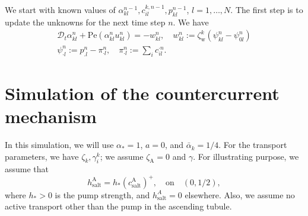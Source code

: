 \documentclass{article}
\begin{document}
We start with known values of $\alpha^{n-1}_{kl},c_{il}^{k,n-1}, p_{kl}^{n-1}$, $l = 1,\dots,N$.
The first step is to update the unknowns for the next time step $n$.
We have
\begin{gather}
    \mathcal{D}_t \alpha_{kl}^n +\mathrm{Pe}(\alpha_{kl}^n u_{kl}^n) = -w_{kl}^{n},\quad w_{kl}^n:=\zeta_\mathrm{w}^k\left( \psi_{kl}^n-\psi_{0l}^n \right)\\
    \psi_{\cdot l}^n:= p_{.l}^n - \pi_{\cdot l}^n,\quad \pi_{\cdot l}^n:= \sum_i c_{il}^{\cdot n}.\nonumber
\end{gather}


\section{Simulation of the countercurrent mechanism}

In this simulation, we will use $\alpha_* = 1$, $a=0$, and $\bar{\alpha}_k = 1/4$.
For the transport parameters, we have $\zeta_k,\gamma_i^k$; we assume $\zeta_\mathrm{A} = 0$ and $\gamma$.
    For illustrating purpose, we assume that
    \begin{equation}
        h_\mathrm{salt}^\mathrm{A} = h_*(c_\mathrm{salt}^\mathrm{A})^+,\quad \text{on}\quad (0,1/2),
    \end{equation}
        where $h_*>0$ is the pump strength, and $h^A_\mathrm{salt} = 0$ elsewhere.
    Also, we assume no active transport other than the pump in the ascending tubule.
\end{document}
